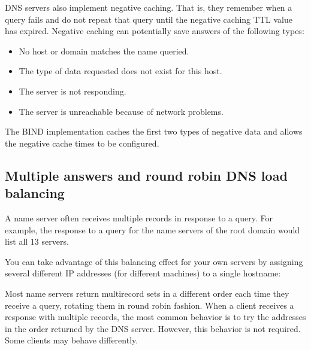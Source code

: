 DNS servers also implement
\protect\hypertarget{part0024_split_016.htmlux5cux23_idIndexMarker2043}{}{}\protect\hypertarget{part0024_split_016.htmlux5cux23_idIndexMarker2044}{}{}negative
caching. That is, they remember when a query fails and do not repeat
that query until the negative caching TTL value has expired. Negative
caching can potentially save answers of the following types:

\begin{itemize}
\item
  No host or domain matches the name queried.
\item
  The type of data requested does not exist for this host.
\item
  The server is not responding.
\item
  The server is unreachable because of network problems.
\end{itemize}

The BIND implementation caches the first two types of negative data and
allows the negative cache times to be configured.

\protect\hypertarget{part0024_split_017.html}{}{}

\hypertarget{part0024_split_017.htmlux5cux23_idContainer1069}{}
\hypertarget{part0024_split_017.htmlux5cux23calibre_pb_16}{%
\subsection[Multiple answers and round robin DNS load
balancing]{\texorpdfstring{\protect\hypertarget{part0024_split_017.htmlux5cux23_idTextAnchor862}{}{}Multiple
answers and round robin DNS load
balancing}{Multiple answers and round robin DNS load balancing}}\label{part0024_split_017.htmlux5cux23calibre_pb_16}}

\protect\hypertarget{part0024_split_017.htmlux5cux23_idIndexMarker2045}{}{}\protect\hypertarget{part0024_split_017.htmlux5cux23_idIndexMarker2046}{}{}A\protect\hypertarget{part0024_split_017.htmlux5cux23_idIndexMarker2047}{}{}
name server often receives multiple records in response to a query. For
example, the response to a query for the name servers of the root domain
would list all 13 servers.

You can take advantage of this balancing effect for your own servers by
assigning several different IP addresses (for different machines) to a
single hostname:


Most name servers return multirecord sets in a different order each time
they receive a query, rotating them in round robin fashion. When a
client receives a response with multiple records, the most common
behavior is to try the addresses in the order returned by the DNS
server. However, this behavior is not required. Some clients may behave
differently.

